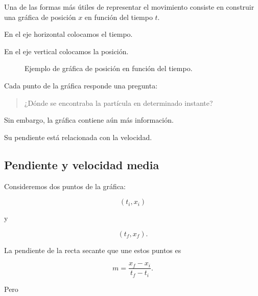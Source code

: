 Una de las formas más útiles de representar el movimiento consiste en
construir una gráfica de posición \(x\) en función del tiempo \(t\).

En el eje horizontal colocamos el tiempo.

En el eje vertical colocamos la posición.

\begin{figure}[H]
    \centering


    \caption{Ejemplo de gráfica de posición en función del tiempo.}
    \label{fig:posicion_tiempo_rectilineo}
\end{figure}

Cada punto de la gráfica responde una pregunta:

\begin{quote}
¿Dónde se encontraba la partícula en determinado instante?
\end{quote}

Sin embargo, la gráfica contiene aún más información.

Su pendiente está relacionada con la velocidad.


\subsection{Pendiente y velocidad media}

Consideremos dos puntos de la gráfica:

\[
(t_i,x_i)
\]

y

\[
(t_f,x_f).
\]

La pendiente de la recta secante que une estos puntos es

\[
m
=
\frac{x_f-x_i}{t_f-t_i}.
\]

Pero

